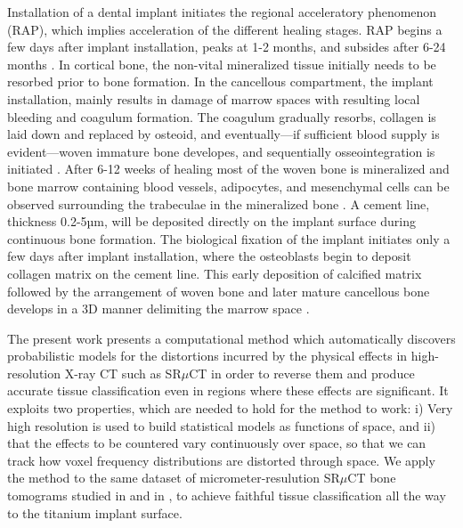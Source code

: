 Installation of a dental implant initiates the regional acceleratory phenomenon (RAP), which
implies acceleration of the different healing stages. RAP begins a few days after implant
installation, peaks at 1-2 months, and subsides after 6-24 months . In cortical bone,
the non-vital mineralized tissue initially needs to be resorbed prior to bone formation. In the
cancellous compartment, the implant installation, mainly results in damage of marrow spaces with
resulting local bleeding and coagulum formation. The coagulum gradually resorbs, collagen is laid
down and replaced by osteoid, and eventually—if sufficient blood supply is evident—woven immature
bone  developes, and sequentially osseointegration is initiated . After 6-12 weeks of
healing most of the woven bone is mineralized and bone marrow containing blood vessels, adipocytes,
and mesenchymal cells can be observed surrounding the trabeculae in the mineralized bone
. A cement line, thickness  0.2-5µm, will be deposited
directly on the implant surface during continuous bone formation. The biological fixation of the
implant initiates only a few days after implant installation, where the osteoblasts begin to deposit
collagen matrix on the cement line. This early deposition of calcified matrix followed by the
arrangement of woven bone and later mature cancellous bone develops in a 3D manner delimiting the
marrow space .

The present work presents a computational method which automatically discovers probabilistic
models for the distortions incurred by the physical effects in high-resolution X-ray CT such
as SR$\mu$CT in order to reverse them and produce accurate tissue classification even in regions
where these effects are significant. It exploits two properties, which are needed to hold for
the method to work: i) Very high resolution is used to build statistical models as functions
of space, and ii) that the effects to be countered vary continuously over space, so that we can
track how voxel frequency distributions are distorted through space. We apply the method to the
same dataset of micrometer-resulution SR$\mu$CT bone tomograms studied in \cite{torsten2018}
and in \cite{sporring}, to achieve faithful tissue classification all the way to the titanium
implant surface.


